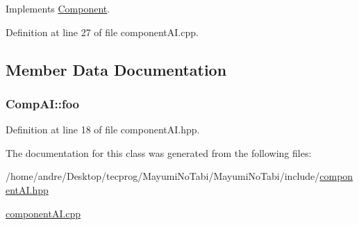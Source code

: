 Implements \hyperlink{class_component_a20c791684d452b36fcce40ac9038c735}{Component}.



Definition at line 27 of file component\-A\-I.\-cpp.



\subsection{Member Data Documentation}
\hypertarget{class_comp_a_i_a7b639e7a28a8b449e35c82032bfb7637}{
\subsubsection[{foo}]{ Comp\-A\-I\-::foo}}\label{class_comp_a_i_a7b639e7a28a8b449e35c82032bfb7637}


Definition at line 18 of file component\-A\-I.\-hpp.



The documentation for this class was generated from the following files\-:\begin{DoxyCompactItemize}
\item 
/home/andre/\-Desktop/tecprog/\-Mayumi\-No\-Tabi/\-Mayumi\-No\-Tabi/include/\hyperlink{component_a_i_8hpp}{component\-A\-I.\-hpp}\item 
\hyperlink{component_a_i_8cpp}{component\-A\-I.\-cpp}\end{DoxyCompactItemize}
